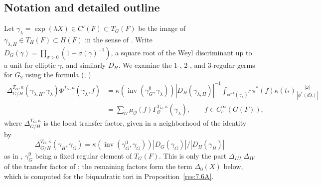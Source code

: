 \documentclass[12pt,letterpaper]{amsart}
\theoremstyle{plain}
\theoremstyle{definition}
\theoremstyle{remark}
\theoremstyle{definition}
\DeclareMathOperator{\inv}{inv}
\begin{document}
\subsection*{Notation and detailed outline}

Let $\gamma_\lambda=\exp(\lambda X)\in C'(F)\subset T_G(F)$ be the image of
$\gamma_{\lambda,H}\in T_H(F)\subset H(F)$ in the sense of \cite{LS90}.
Write $D_G(\gamma)=\prod_{\sigma>0}(1-\sigma(\gamma)^{-1})$, a square root of
the Weyl discriminant up to a unit for elliptic $\gamma$, and similarly
$D_H$. We examine the $1$-, $2$-,
and $3$-regular germs for $G_2$ using the formula (\cite{Sh72}, \cite{LS90})
\begin{equation}\tag{0.1}\label{eq:0.1}
\begin{split}
\Delta_{G/H}^{T_G,\kappa}(\gamma_{\lambda,H},\gamma_{\lambda})
\Phi^{T_G,\kappa}(\gamma_{\lambda},f)
&=\kappa(\inv(\gamma^0_{G},\gamma_{\lambda}))
|D_H(\gamma_{\lambda,H})|^{-1}
\int_{\phi^{-1}(\gamma_{\lambda})^\Gamma}\pi^*(f)
\kappa(t_*)\frac{|\omega|}{|\phi^*(d\lambda)|}\\
&=\sum_{{\mathcal O}}\mu_{\mathcal O}(f)
\Gamma_{{\mathcal O}}^{T_G,\kappa}(\gamma_{\lambda}),
\qquad f\in C_c^\infty(G(F)),
\end{split}
\end{equation}
where $\Delta_{G/H}^{T_G,\kappa}$ is the local transfer factor, given in a
neighborhood of the identity by
\[
\Delta_{G/H}^{T_G,\kappa}(\gamma_{H},\gamma_G)
=\kappa(\inv(\gamma^0_G,\gamma_G))|D_G(\gamma_G)|/|D_H(\gamma_H)|
\]
as in \cite{LS90}, $\gamma_G^0$ being a fixed regular element of $T_G(F)$.
This is only the part $\Delta_{III_1}\Delta_{IV}$ of the transfer factor
of \cite{LS87}; the remaining factors form the term $\Delta_0(X)$ below,
which is computed for the biquadratic tori in Proposition~\ref{res:7.6A}.
\end{document}
